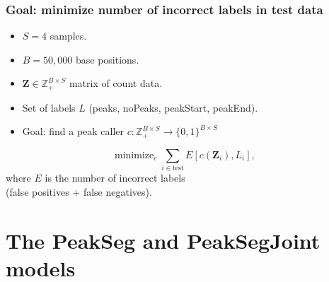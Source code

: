\documentclass{beamer}
\DeclareMathOperator*{\minimize}{minimize}
\newcommand{\ZZ}{\mathbb Z}
\begin{document}
\begin{frame}
  \frametitle{Goal: minimize number of incorrect labels in test data}
  \begin{itemize}
  \item $S=4$ samples.
  \item $B=50,000$ base positions.
  \item $\mathbf Z \in\ZZ_+^{B\times S}$ matrix of count data.
  \item Set of labels $L$ (peaks, noPeaks, peakStart, peakEnd).
  \item Goal: find a peak caller $c:\ZZ_+^{B\times S} \rightarrow
    \{0,1\}^{B\times S}$ 
  \end{itemize}
  \begin{equation*}
    \label{eq:min_test_err}
    \minimize_c \sum_{i\in\text{test}} E[c(\mathbf Z_i),  L_i],
  \end{equation*}
  where $E$ is the number of incorrect labels\\(false positives + false
  negatives).
\end{frame}

\section{The PeakSeg and PeakSegJoint models} 


\end{document}

